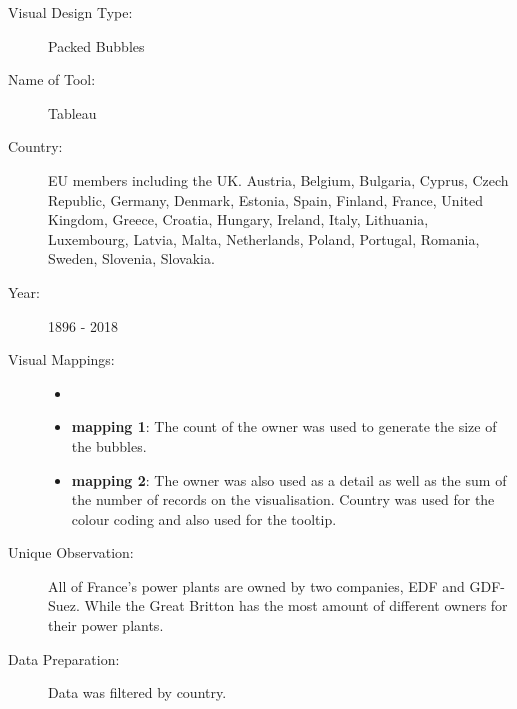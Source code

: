 \begin{description}
\item[Visual Design Type:]
Packed Bubbles
\item[Name of Tool:]
Tableau
\item[Country:]
EU members including the UK.  Austria, Belgium, Bulgaria, Cyprus, Czech Republic, Germany, Denmark, Estonia, Spain, Finland, France, United Kingdom, Greece, Croatia, Hungary, Ireland, Italy, Lithuania, Luxembourg, Latvia, Malta, Netherlands, Poland, Portugal, Romania, Sweden, Slovenia, Slovakia.
\item[Year:]
1896 - 2018
\item[Visual Mappings:]
\begin{itemize}
	\tightlist
	\item[  ]
\end{itemize}
\begin{itemize}
\tightlist
\item
  \textbf{mapping 1}: The count of the owner was used to generate the size of the bubbles. 
\end{itemize}

\begin{itemize}
\tightlist
\item
  \textbf{mapping 2}: The owner was also used as a detail as well as the sum of the number of records on the visualisation. Country was used for the colour coding and also used for the tooltip.
\end{itemize}
\item[Unique Observation:]
All of France’s power plants are owned by two companies, EDF and GDF-Suez. While the Great Britton has the most amount of different owners for their power plants.
\item[Data Preparation:]
Data was filtered by country.
\end{description}